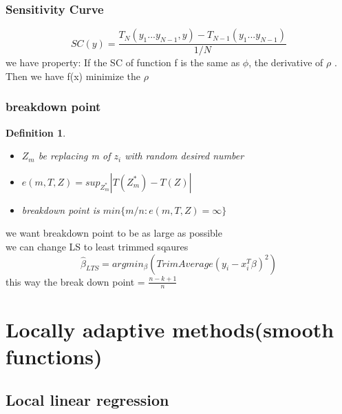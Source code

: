 \documentclass[10pt]{article}
\theoremstyle{break}
\newtheorem{defn}{Definition}[subsection]
\begin{document}
        \subsubsection{Sensitivity Curve}
            $$SC(y)=\frac{T_N(y_1...y_{N-1},y)-T_{N-1}(y_1...y_{N-1})}{1/N}$$
            we have property: If the SC of function f is the same as $\phi$, the derivative of $\rho$
        . Then we have f(x) minimize the $\rho$
        \subsubsection{breakdown point}
            \begin{defn}
                \begin{itemize}
                    \item $Z_m$ be replacing m of $z_i$ with random desired number 
                    \item $e(m,T,Z)=sup_{Z^*_m}|T(Z^*_m)-T(Z)|$
                    \item breakdown point is $min\{m/n:e(m,T,Z)=\infty\}$
                \end{itemize}
            \end{defn}
        we want breakdown point to be as large as possible 
        \\we can change LS to least trimmed sqaures
        $$\hat{\beta}_{LTS}=argmin_\beta(TrimAverage(y_i-x_i^T\beta)^2)$$ this way the break down point = $\frac{n-k+1}{n}$

\section{Locally adaptive methods(smooth functions)}
    \subsection{Local linear regression}
\end{document}
